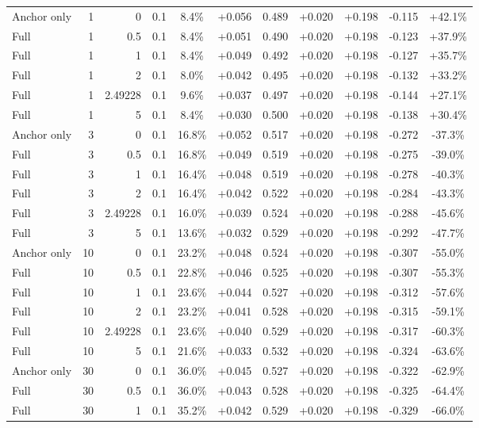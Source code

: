 \begin{table}[htbp]
\begin{tabular}{lrrrccccccc}
Anchor only & 1 & 0 & 0.1 & 8.4\% & +0.056 & 0.489 & +0.020 & +0.198 & -0.115 & +42.1\% \\
Full & 1 & 0.5 & 0.1 & 8.4\% & +0.051 & 0.490 & +0.020 & +0.198 & -0.123 & +37.9\% \\
Full & 1 & 1 & 0.1 & 8.4\% & +0.049 & 0.492 & +0.020 & +0.198 & -0.127 & +35.7\% \\
Full & 1 & 2 & 0.1 & 8.0\% & +0.042 & 0.495 & +0.020 & +0.198 & -0.132 & +33.2\% \\
Full & 1 & 2.49228 & 0.1 & 9.6\% & +0.037 & 0.497 & +0.020 & +0.198 & -0.144 & +27.1\% \\
Full & 1 & 5 & 0.1 & 8.4\% & +0.030 & 0.500 & +0.020 & +0.198 & -0.138 & +30.4\% \\
Anchor only & 3 & 0 & 0.1 & 16.8\% & +0.052 & 0.517 & +0.020 & +0.198 & -0.272 & -37.3\% \\
Full & 3 & 0.5 & 0.1 & 16.8\% & +0.049 & 0.519 & +0.020 & +0.198 & -0.275 & -39.0\% \\
Full & 3 & 1 & 0.1 & 16.4\% & +0.048 & 0.519 & +0.020 & +0.198 & -0.278 & -40.3\% \\
Full & 3 & 2 & 0.1 & 16.4\% & +0.042 & 0.522 & +0.020 & +0.198 & -0.284 & -43.3\% \\
Full & 3 & 2.49228 & 0.1 & 16.0\% & +0.039 & 0.524 & +0.020 & +0.198 & -0.288 & -45.6\% \\
Full & 3 & 5 & 0.1 & 13.6\% & +0.032 & 0.529 & +0.020 & +0.198 & -0.292 & -47.7\% \\
Anchor only & 10 & 0 & 0.1 & 23.2\% & +0.048 & 0.524 & +0.020 & +0.198 & -0.307 & -55.0\% \\
Full & 10 & 0.5 & 0.1 & 22.8\% & +0.046 & 0.525 & +0.020 & +0.198 & -0.307 & -55.3\% \\
Full & 10 & 1 & 0.1 & 23.6\% & +0.044 & 0.527 & +0.020 & +0.198 & -0.312 & -57.6\% \\
Full & 10 & 2 & 0.1 & 23.2\% & +0.041 & 0.528 & +0.020 & +0.198 & -0.315 & -59.1\% \\
Full & 10 & 2.49228 & 0.1 & 23.6\% & +0.040 & 0.529 & +0.020 & +0.198 & -0.317 & -60.3\% \\
Full & 10 & 5 & 0.1 & 21.6\% & +0.033 & 0.532 & +0.020 & +0.198 & -0.324 & -63.6\% \\
Anchor only & 30 & 0 & 0.1 & 36.0\% & +0.045 & 0.527 & +0.020 & +0.198 & -0.322 & -62.9\% \\
Full & 30 & 0.5 & 0.1 & 36.0\% & +0.043 & 0.528 & +0.020 & +0.198 & -0.325 & -64.4\% \\
Full & 30 & 1 & 0.1 & 35.2\% & +0.042 & 0.529 & +0.020 & +0.198 & -0.329 & -66.0\% \\

\end{tabular}
\end{table}
